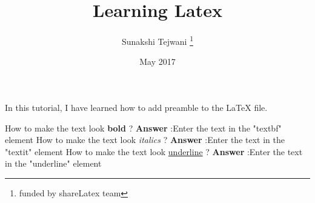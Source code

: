 \documentclass[12pt, letterpaper, twoside]{article}
\title{Learning Latex}
\author{Sunakshi Tejwani \thanks{funded by shareLatex team}}
\date{May 2017}
\begin{document}
\maketitle
In this tutorial, I have learned how to add preamble to the \LaTeX{} file.

How to make the text look \textbf{bold} ?
\textbf{Answer} :Enter the text in the "textbf{}" element
How to make the text look \textit{italics} ?
\textbf{Answer} :Enter the text in the "textit{}" element
How to make the text look \underline{underline} ?
\textbf{Answer} :Enter the text in the "underline{}" element
\end{document}
